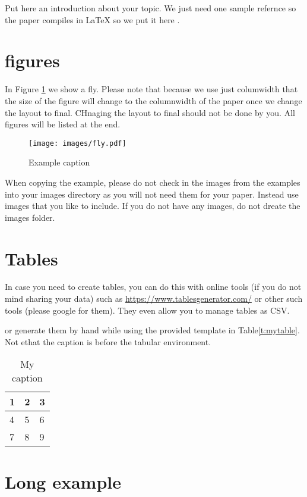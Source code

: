 \documentclass[sigconf]{acmart}
\begin{document}
Put here an introduction about your topic. 
We just need one sample refernce so the paper compiles in LaTeX so we
put it here \cite{editor00}.

\section{figures}

In Figure \ref{f:fly} we show a fly. Please note that because we use
just columwidth that the size of the figure will change to the
columnwidth of the paper once we change the layout to final. CHnaging
the layout to final should not be done by you. All figures will be
listed at the end.

\begin{figure}[!ht]
  \centering\texttt{[image: images/fly.pdf]}
  \caption{Example caption}\label{f:fly}
\end{figure}

When copying the example, please do not check in the images from the
examples into your images directory as you will not need them for your
paper. Instead use images that you like to include. If you do not have
any images, do not dreate the images folder.

\section{Tables}

In case you need to create tables, you can do this with online tools
(if you do not mind sharing your data) such as
\url{https://www.tablesgenerator.com/} or other such tools (please
google for them). They even allow you to manage tables as CSV.

or generate them by hand while using the provided template in Table\ref{t:mytable}. Not ethat
the caption is before the tabular environment.

\begin{table}[htb]
\centering
\caption{My caption}
\label{t:mytabble}
\begin{tabular}{lll}
1 & 2 & 3 \\
\hline
4 & 5 & 6 \\
7 & 8 & 9
\end{tabular}
\end{table}

\section{Long example}
\end{document}
